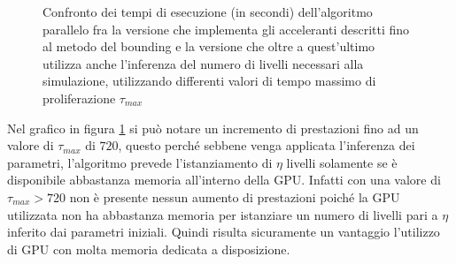 \begin{figure}[t]
    \centering
    \caption{Confronto dei tempi di esecuzione (in secondi) dell'algoritmo
    parallelo fra la versione che implementa gli acceleranti descritti fino al
    metodo del bounding
    e la versione che oltre a quest'ultimo utilizza anche l'inferenza del numero
    di livelli necessari alla simulazione,
    utilizzando differenti valori di tempo massimo di proliferazione
    $\tau_{max}$}
    \label{chart:bounding-inference}
\end{figure}
Nel grafico in figura \ref{chart:bounding-inference} si può notare un
incremento di prestazioni fino
ad un valore di $\tau_{max}$ di $720$, questo perché sebbene venga applicata
l'inferenza dei parametri, l'algoritmo prevede l'istanziamento di $\eta$
livelli solamente se è disponibile abbastanza memoria all'interno della GPU.
Infatti con una valore di $\tau_{max} > 720$ non è presente nessun aumento
di prestazioni poiché la GPU utilizzata non ha abbastanza memoria per istanziare
un numero di livelli pari a $\eta$ inferito dai parametri iniziali.
Quindi risulta sicuramente un vantaggio l'utilizzo di GPU con molta memoria
dedicata a disposizione.

